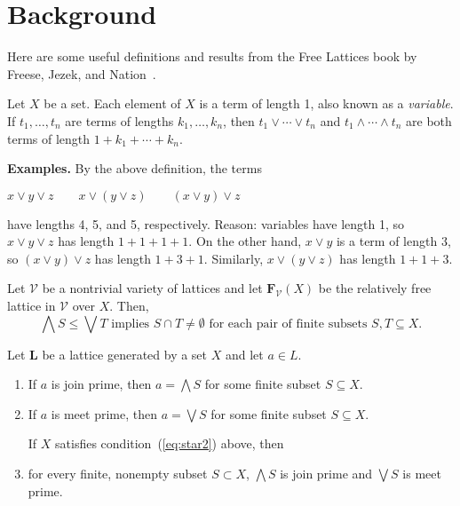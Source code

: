 \newpage



\section{Background}
Here are some useful definitions and results from the Free Lattices book by Freese, Jezek, and Nation~\cite{MR1319815}.

\begin{definition} Let $X$ be a set. Each element of $X$ is a term of length 1, also known as a \emph{variable}. If $t_1, \dots, t_n$ are terms of 
lengths $k_1, \dots, k_n$, then $t_1 \vee \cdots \vee t_n$ and 
$t_1 \wedge \cdots \wedge t_n$ are both terms of length $1+ k_1 + \cdots + k_n$.
\end{definition}

{\bf Examples.} By the above definition, the terms 

$x \vee y \vee z \qquad x \vee (y \vee z) \qquad (x \vee y) \vee z$

have lengths 4, 5, and 5, respectively. Reason: variables have length 1, so $x \vee y \vee z$ has length $1 + 1 + 1 + 1$.  On the other hand, $x\vee y$ is a term of length $3$, so $(x \vee y) \vee z$ has length $1 + 3 + 1$. Similarly, 
$x \vee (y \vee z)$ has length $1 + 1 + 3$.

\begin{lemma}
Let $\mathcal{V}$ be a nontrivial variety of lattices and let $\mathbf{F}_{\mathcal V}(X)$ be the relatively free lattice in $\mathcal V$ over $X$.  Then,
\begin{equation}
  \label{eq:star2}
\bigwedge S \leqslant \bigvee T \text{ implies }S \cap T \neq \emptyset
\text{ for each pair of finite subsets $S, T \subseteq X$.}
\end{equation}
\end{lemma}

\begin{lemma}
Let $\mathbf L$ be a lattice generated by a set $X$ and let $a \in L$.
\begin{enumerate}
\item 
If $a$ is join prime, then $a = \bigwedge S$ for some finite subset $S \subseteq X$.
\item 
If $a$ is meet prime, then $a = \bigvee S$ for some finite subset $S \subseteq X$.

If $X$ satisfies condition~(\ref{eq:star2}) above, then 
\item for every finite, nonempty subset $S \subset X$, $\bigwedge S$ is join prime and $\bigvee S$ is meet prime.
\end{enumerate}
\end{lemma}

